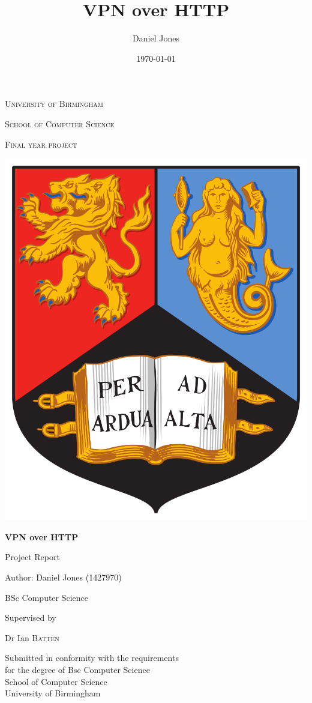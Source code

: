 \documentclass[hidelinks,12pt]{article}
\title{VPN over HTTP}
\author{Daniel Jones}
\date{\today}
\begin{document}
\begin{titlepage}
	\centering
	\vspace{2cm}
	{\scshape\LARGE University of Birmingham \par}
	\vspace{1cm}
	{\scshape\Large School of Computer Science \par}
	{\scshape\Large Final year project\par}
	\vspace{1cm}
	\includegraphics[scale = 0.12]{images/uni-crest}
	\vfill
    {\huge\bfseries VPN over HTTP \par}
    {\Large Project Report \par}
	\vspace{2cm}
    {\Large{Author: Daniel Jones (1427970)} \par}
	\vspace{0.25cm}
    {\Large{BSc Computer Science} \par}
	\vfill
	Supervised by\par
	Dr Ian \textsc{Batten}\par
    \vfill
    \tiny{Submitted in conformity with the requirements\\
for the degree of Bsc Computer Science\\
School of Computer Science\\
University of Birmingham}
	\vfill

	{\par}
\end{titlepage}
\end{document}
